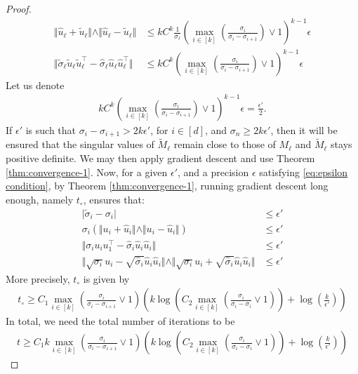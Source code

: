 \begin{proof}
\begin{align}
          \Vert \hat{u}_\ell + \tilde{u}_\ell \Vert \wedge \Vert \hat{u}_\ell - \tilde{u}_\ell \Vert & \le k C^k \frac{1}{\sigma_\ell} \left(\max_{i \in [k]}\left(\frac{\sigma_i}{\sigma_i - \sigma_{i+1}}\right)\vee 1 \right)^{k-1}   \epsilon  \\ 
          \Vert \tilde{\sigma}_\ell \tilde{u}_\ell \tilde{u}_\ell^\top -  \hat{\sigma}_\ell \hat{u}_\ell \hat{u}_\ell^\top \Vert & \le k C^k  \left(\max_{i \in [k]}\left(\frac{\sigma_i}{\sigma_i - \sigma_{i+1}}\right)\vee 1 \right)^{k-1}   \epsilon 
    \end{align}
    Let us denote 
    \begin{align} \label{eq:epsilon condition}
         k C^k  \left(\max_{i \in [k]}\left(\frac{\sigma_i}{\sigma_i - \sigma_{i+1}}\right)\vee 1 \right)^{k-1}   \epsilon  = \frac{\epsilon'}{2}. 
    \end{align}
    If  $\epsilon'$ is such that $\sigma_i - \sigma_{i+1} >2k \epsilon'$, for $i \in[d]$, and $\sigma_n \ge 2k\epsilon'$, then it will be ensured that the singular values of $\tilde{M}_\ell$ remain close to those of $M_\ell$ and $\tilde{M}_\ell$  stays positive definite.  We may then apply gradient descent and use Theorem \ref{thm:convergence-1}. Now, for a given $\epsilon'$, and a precision $\epsilon$ satisfying \eqref{eq:epsilon condition}, by Theorem \ref{thm:convergence-1}, running gradient descent long enough, namely $t_\circ$, ensures that:
    \begin{align*}
        \vert \tilde{\sigma}_i - \sigma_i \vert & \le \epsilon'  \\
        \sigma_i (\Vert u_i  + \hat{u}_i  \Vert \wedge  \Vert u_i  - \hat{u}_i \Vert) & \le  \epsilon' \\
        \Vert \sigma_i  u_i u_1^\top - \hat{\sigma}_i \hat{u}_i \hat{u}_i \Vert  & \le \epsilon' \\
        \Vert \sqrt{\sigma_i}  u_i  - \sqrt{\hat{\sigma}_i} \hat{u}_i \hat{u}_i \Vert  \wedge  \Vert \sqrt{\sigma_i}  u_i  + \sqrt{\hat{\sigma}_i} \hat{u}_i \hat{u}_i \Vert  & \le \epsilon'
    \end{align*}
    More precisely, $t_\circ$ is given by 
    \begin{align*}
        t_\circ \ge C_1  \max_{i\in[k]}\left( \frac{\sigma_i }{\sigma_i - \sigma_{i+1}} \vee 1 \right)   \left( k \log\left( C_2 \max_{i\in[k]}\left( \frac{\sigma_i}{\sigma_i - \sigma_i} \vee 1\right)\right) + \log\left( \frac{k}{\epsilon'}\right) \right)
    \end{align*}
    In total, we need the total number of iterations to be 
    \begin{align*}
        t \ge C_1  k \max_{i\in[k]}\left( \frac{\sigma_i }{\sigma_i - \sigma_{i+1}} \vee 1 \right)   \left( k \log\left( C_2 \max_{i\in[k]}\left( \frac{\sigma_i}{\sigma_i - \sigma_i} \vee 1\right)\right) + \log\left( \frac{k}{\epsilon'}\right) \right)
    \end{align*} 
\end{proof}


